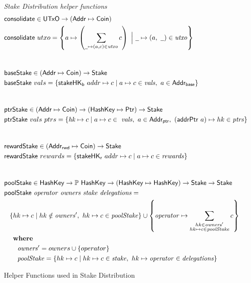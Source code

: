 \begin{figure}[htb]
  \emph{Stake Distribution helper functions}
  \begin{align*}
      & \fun{consolidate} \in \UTxO \to (\Addr \mapsto \Coin) \\
      & \fun{consolidate}~{utxo} =
        \left\{a \mapsto \left(\sum_{\wcard\mapsto(a,c)\in\var{utxo}}c\right)
        ~\Big\vert~
        \wcard\mapsto(a,~\wcard)\in\var{utxo} \right\} \\
      \nextdef
      & \fun{baseStake} \in (\Addr\mapsto\Coin) \to \Stake \\
      & \fun{baseStake}~{vals} =
          \{\fun{stakeHK_b}~{addr}\mapsto c \mid a\mapsto c\in\var{vals},~a\in\AddrB\} \\
      \nextdef
      & \fun{ptrStake} \in (\Addr\mapsto\Coin) \to (\HashKey\mapsto\Ptr) \to \Stake \\
      & \fun{ptrStake}~{vals}~{ptrs} =
          \{\var{hk}\mapsto c
          \mid a\mapsto
          c\in~\var{vals},~a\in\AddrP,~(\fun{addrPtr}~a) \mapsto hk\in\var{ptrs}\} \\
      \nextdef
      & \fun{rewardStake} \in (\AddrRWD\mapsto\Coin) \to \Stake \\
      & \fun{rewardStake}~{rewards} =
          \{\fun{stakeHK_r}~{addr}\mapsto c \mid a\mapsto c\in\var{rewards}\} \\
      \nextdef
      & \fun{poolStake} \in \HashKey \to \powerset{\HashKey} \to (\HashKey \mapsto \HashKey)
          \to \Stake \to \Stake \\
      & \poolStake{operator}{owners}{stake}{delegations} = \\
      & ~~ \left\{hk\mapsto c \mid hk\notin\var{owners'},~hk\mapsto c\in\var{poolStake} \right\}
           \cup
           \left\{ \var{operator}\mapsto
             \sum_{\substack{hk\in\var{owners'} \\ hk\mapsto c\in\var{poolStake}}} c\right\} \\
      & ~~ \where \\
      & ~~~~~~ \var{owners'} = owners \cup \{operator\} \\
      & ~~~~~~ \var{poolStake} =
                 \{hk \mapsto c
                 \mid
                 hk \mapsto c\in\var{stake},~hk\mapsto\var{operator}\in\var{delegations} \} \\
  \end{align*}
  \caption{Helper Functions used in Stake Distribution}
  \label{fig:functions:helper-stake-distribution}
\end{figure}

